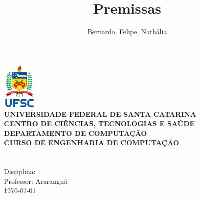 \documentclass[a4paper,12pt]{article}
\author{Bernardo, Felipe, Nathália}
\title{Premissas}
\begin{document}
\makeatletter
\begin{titlepage}
    \begin{center}
    \includegraphics[width=64px]{./assets/vertical_sigla_fundo_claro.png}\\
        \small
        \vspace{0.25cm}
        \textbf{UNIVERSIDADE FEDERAL DE SANTA CATARINA}\\
		\textbf{CENTRO DE CIÊNCIAS, TECNOLOGIAS E SAÚDE}\\
		\textbf{DEPARTAMENTO DE COMPUTAÇÃO}\\
		\textbf{CURSO DE ENGENHARIA DE COMPUTAÇÃO}\\
        \vspace{7cm}
        \Large
        \textbf{\@title}\\
        \vspace{0.5cm}
        \normalsize
        \textbf{\@author}\\
        \vspace{1.5cm}
        \small
        Disciplina:\\
        Professor:
        \vfill
        Araranguá\\
        \today
    \end{center}
\end{titlepage}
\makeatother

\tableofcontents
\newpage

\end{document}

